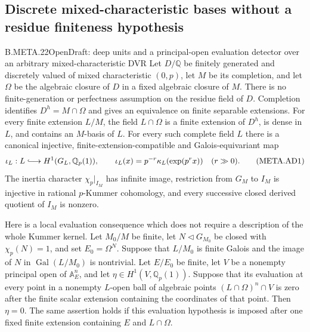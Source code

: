 
\subsection{Discrete mixed-characteristic bases without a residue finiteness hypothesis}

\begin{claim}{B.META.22}{Open}{Draft: deep units and a principal-open evaluation detector over an arbitrary mixed-characteristic DVR}
Let $D/\mathbb Q$ be finitely generated and discretely valued
of mixed characteristic $(0,p)$, let $M$ be its completion,
and let $\Omega$ be the algebraic closure of $D$ in a fixed
algebraic closure of $M$.
There is no finite-generation or perfectness assumption on
the residue field of $D$.
Completion identifies $D^h=M\cap\Omega$ and gives an
equivalence on finite separable extensions.  For every
finite extension $L/M$, the field $L\cap\Omega$ is a finite
extension of $D^h$, is dense in $L$, and contains an
$M$-basis of $L$.
For every such complete field $L$ there is a canonical
injective, finite-extension-compatible and Galois-equivariant
map
\[
 \iota_L:L\lhook\joinrel\longrightarrow H^1(G_L,\mathbb Q_p(1)),
 \qquad \iota_L(x)=p^{-r}\kappa_L(\exp(p^r x))\quad(r\gg0).
                                                               \tag{META.AD1}
\]
The inertia character $\chi_p|_{I_M}$ has infinite image,
restriction from $G_M$ to $I_M$ is injective in rational
$p$-Kummer cohomology, and every successive closed derived
quotient of $I_M$ is nonzero.

Here is a local evaluation consequence which does not
require a description of the whole Kummer kernel.
Let $M_0/M$ be finite, let
$N\triangleleft G_{M_0}$ be closed with $\chi_p(N)=1$,
and set $E_0=\Omega^N$.
Suppose that $L/M_0$ is finite Galois and the image of
$N$ in $\operatorname{Gal}(L/M_0)$ is nontrivial.
Let $E/E_0$ be finite, let $V$ be a nonempty principal
open of $\mathbb A^n_E$, and let
$\eta\in H^1(V,\mathbb Q_p(1))$.
Suppose that its evaluation at every point in a nonempty
$L$-open ball of algebraic points
$(L\cap\Omega)^n\cap V$ is zero after the finite scalar
extension containing the coordinates of that point.
Then $\eta=0$.
The same assertion holds if this evaluation hypothesis
is imposed after one fixed finite extension containing
$E$ and $L\cap\Omega$.
\end{claim}
